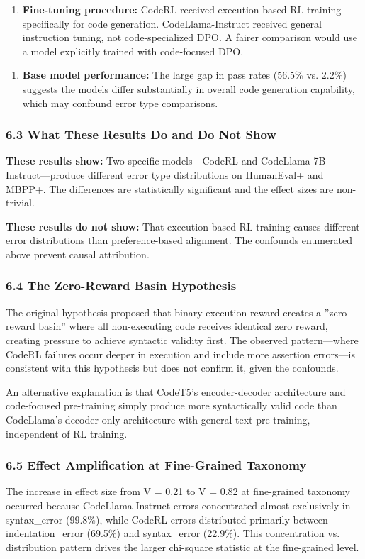 \begin{enumerate}
\item \textbf{Fine-tuning procedure:} CodeRL received execution-based RL training specifically for code generation. CodeLlama-Instruct received general instruction tuning, not code-specialized DPO. A fairer comparison would use a model explicitly trained with code-focused DPO.
\end{enumerate}

\begin{enumerate}
\item \textbf{Base model performance:} The large gap in pass rates (56.5\% vs. 2.2\%) suggests the models differ substantially in overall code generation capability, which may confound error type comparisons.
\end{enumerate}

\subsubsection{6.3 What These Results Do and Do Not Show}

\textbf{These results show:} Two specific models---CodeRL and CodeLlama-7B-Instruct---produce different error type distributions on HumanEval+ and MBPP+. The differences are statistically significant and the effect sizes are non-trivial.

\textbf{These results do not show:} That execution-based RL training causes different error distributions than preference-based alignment. The confounds enumerated above prevent causal attribution.

\subsubsection{6.4 The Zero-Reward Basin Hypothesis}

The original hypothesis proposed that binary execution reward creates a ''zero-reward basin'' where all non-executing code receives identical zero reward, creating pressure to achieve syntactic validity first. The observed pattern---where CodeRL failures occur deeper in execution and include more assertion errors---is consistent with this hypothesis but does not confirm it, given the confounds.

An alternative explanation is that CodeT5's encoder-decoder architecture and code-focused pre-training simply produce more syntactically valid code than CodeLlama's decoder-only architecture with general-text pre-training, independent of RL training.

\subsubsection{6.5 Effect Amplification at Fine-Grained Taxonomy}

The increase in effect size from V = 0.21 to V = 0.82 at fine-grained taxonomy occurred because CodeLlama-Instruct errors concentrated almost exclusively in syntax\_error (99.8\%), while CodeRL errors distributed primarily between indentation\_error (69.5\%) and syntax\_error (22.9\%). This concentration vs. distribution pattern drives the larger chi-square statistic at the fine-grained level.
